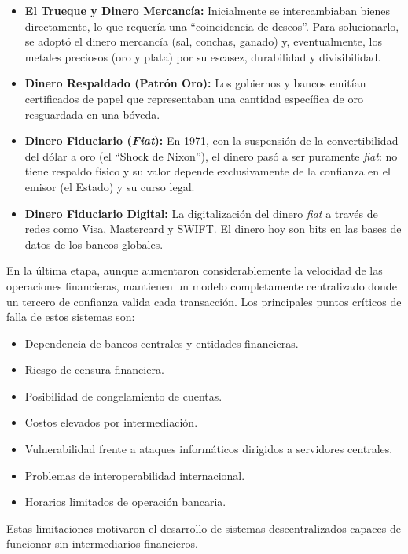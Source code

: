 \documentclass[12pt,a4paper]{article}
\begin{document}
\begin{itemize}
  \item \textbf{El Trueque y Dinero Mercancía:} Inicialmente se intercambiaban bienes
        directamente, lo que requería una ``coincidencia de deseos''. Para solucionarlo, se
        adoptó el dinero mercancía (sal, conchas, ganado) y, eventualmente, los metales
        preciosos (oro y plata) por su escasez, durabilidad y divisibilidad.
  \item \textbf{Dinero Respaldado (Patrón Oro):} Los gobiernos y bancos emitían certificados de
        papel que representaban una cantidad específica de oro resguardada en una
        bóveda.
  \item \textbf{Dinero Fiduciario (\textit{Fiat}):} En 1971, con la suspensión de la convertibilidad del dólar
        a oro (el ``Shock de Nixon''), el dinero pasó a ser puramente \textit{fiat}: no tiene respaldo
        físico y su valor depende exclusivamente de la confianza en el emisor (el Estado) y
        su curso legal.
  \item \textbf{Dinero Fiduciario Digital:} La digitalización del dinero \textit{fiat} a través de redes como
        Visa, Mastercard y SWIFT. El dinero hoy son bits en las bases de datos de los
        bancos globales.
\end{itemize}

En la última etapa, aunque aumentaron considerablemente la velocidad de las operaciones
financieras, mantienen un modelo completamente centralizado donde un tercero de
confianza valida cada transacción.
Los principales puntos críticos de falla de estos sistemas son:

\begin{itemize}
  \item Dependencia de bancos centrales y entidades financieras.
  \item Riesgo de censura financiera.
  \item Posibilidad de congelamiento de cuentas.
  \item Costos elevados por intermediación.
  \item Vulnerabilidad frente a ataques informáticos dirigidos a servidores centrales.
  \item Problemas de interoperabilidad internacional.
  \item Horarios limitados de operación bancaria.
\end{itemize}

Estas limitaciones motivaron el desarrollo de sistemas descentralizados capaces de
funcionar sin intermediarios financieros.
\end{document}
